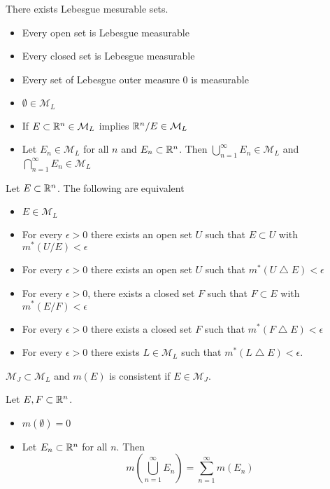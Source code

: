 \documentclass[a4paper]{article}
\begin{document}
\begin{prp} There exists Lebesgue mesurable sets. 
\begin{itemize}
\item Every open set is Lebesgue measurable
\item Every closed set is Lebesgue measurable
\item Every set of Lebesgue outer measure $0$ is measurable
\item $\emptyset\in\mathcal{M}_L$
\item If $E\subset\mathbb{R}^n\in\mathcal{M}_L$ implies $\mathbb{R}^n/E\in\mathcal{M}_L$
\item Let $E_n\in\mathcal{M}_L$ for all $n$ and $E_n\subset\mathbb{R}^n$. Then $\bigcup_{n=1}^\infty E_n\in\mathcal{M}_L$ and $\bigcap_{n=1}^\infty E_n\in\mathcal{M}_L$
\end{itemize}
\end{prp}

\begin{thm} Let $E\subset\mathbb{R}^n$. The following are equivalent
\begin{itemize}
\item $E\in\mathcal{M}_L$
\item For every $\epsilon>0$ there exists an open set $U$ such that $E\subset U$ with $m^\ast(U/E)<\epsilon$
\item For every $\epsilon>0$ there exists an open set $U$ such that $m^\ast(U\bigtriangleup E)<\epsilon$
\item For every $\epsilon>0$, there exists a closed set $F$ such that $F\subset E$ with $m^\ast(E/F)<\epsilon$
\item For every $\epsilon>0$ there exists a closed set $F$ such that $m^\ast(F\bigtriangleup E)<\epsilon$
\item For every $\epsilon>0$ there exists $L\in\mathcal{M}_L$ such that $m^\ast(L\bigtriangleup E)<\epsilon$. 
\end{itemize}
\end{thm}

\begin{lmm} $\mathcal{M}_J\subset\mathcal{M}_L$ and $m(E)$ is consistent if $E\in\mathcal{M}_J$. 
\end{lmm}

\begin{prp} Let $E,F\subset\mathbb{R}^n$. 
\begin{itemize}
\item $m(\emptyset)=0$
\item Let $E_n\subset\mathbb{R}^n$ for all $n$. Then $$m\left(\bigcup_{n=1}^\infty E_n\right)=\sum_{n=1}^\infty m(E_n)$$
\end{itemize}
\end{prp}
\end{document}
